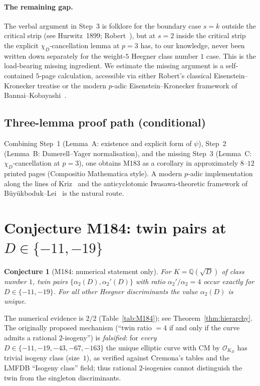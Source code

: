 \documentclass[12pt]{amsart}
\newtheorem{conjecture}[theorem]{Conjecture}
\theoremstyle{definition}
\newcommand{\Q}{\mathbb{Q}}
\begin{document}
\paragraph{The remaining gap.} The verbal argument in Step~3 is
folklore for the boundary case $s = k$ outside the critical strip
(see Hurwitz~1899; Robert~\cite{CITE-NEEDED-Robert1973}), but at
$s = 2$ inside the critical strip the explicit
$\chi_D$-cancellation lemma at $p = 3$ has, to our knowledge, never
been written down separately for the weight-$5$ Heegner class number
$1$ case. This is the load-bearing missing ingredient. We estimate
the missing argument is a self-contained $5$-page calculation,
accessible via either Robert's classical Eisenstein--Kronecker
treatise or the modern $p$-adic Eisenstein--Kronecker framework of
Bannai--Kobayashi~\cite{CITE-NEEDED-BannaiKobayashi2011}.

\subsection{Three-lemma proof path (conditional)}

Combining Step~1 (Lemma~A: existence and explicit form of $\psi$),
Step~2 (Lemma~B: Damerell--Yager normalisation), and the missing
Step~3 (Lemma~C: $\chi_D$-cancellation at $p = 3$), one obtains
M183 as a corollary in approximately $8$--$12$ printed pages
(Compositio Mathematica style). A modern $p$-adic implementation
along the lines of Kriz~\cite{Kriz2018} and the anticyclotomic
Iwasawa-theoretic framework of B\"uy\"ukboduk--Lei~\cite{BuyukbodukLei2016}
is the natural route.

\section{Conjecture M184: twin pairs at $D \in \{-11,-19\}$}
\label{sec:M184}

\begin{conjecture}[M184: numerical statement only]\label{conj:M184}
For $K = \Q(\sqrt{D})$ of class number $1$, twin pairs
$\{\alpha_2(D), \alpha_2'(D)\}$ with ratio $\alpha_2'/\alpha_2 = 4$
occur exactly for $D \in \{-11, -19\}$. For all other Heegner
discriminants the value $\alpha_2(D)$ is unique.
\end{conjecture}

The numerical evidence is $2/2$ (Table~\ref{tab:M184}); see
Theorem~\ref{thm:hierarchy}. The originally proposed mechanism
(``twin ratio $= 4$ if and only if the curve admits a rational
$2$-isogeny'') is \emph{falsified}: for \emph{every}
$D \in \{-11,-19,-43,-67,-163\}$ the unique elliptic curve with CM
by $\mathcal{O}_{K_D}$ has trivial isogeny class (size~$1$), as verified against
Cremona's tables and the LMFDB ``Isogeny class'' field; thus
rational $2$-isogenies cannot distinguish the twin from the singleton
discriminants.
\end{document}
